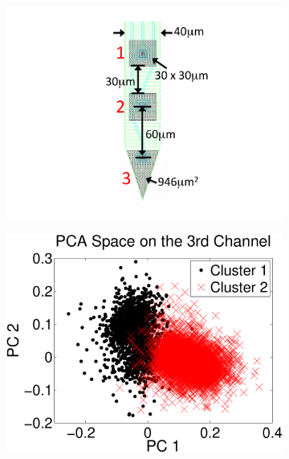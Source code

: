 \begin{center}
\begin{figure}[h!]
\begin{subfigure}[b]{.2\textwidth}
\includegraphics[width=1\textwidth]{../figs/3dev}
\caption{}
\label{3dev}
\end{subfigure}
\begin{subfigure}[b]{.5\textwidth}
\includegraphics[width=\textwidth]{../figs/new/3chpca}

\end{subfigure}
\end{figure}
\end{center}
